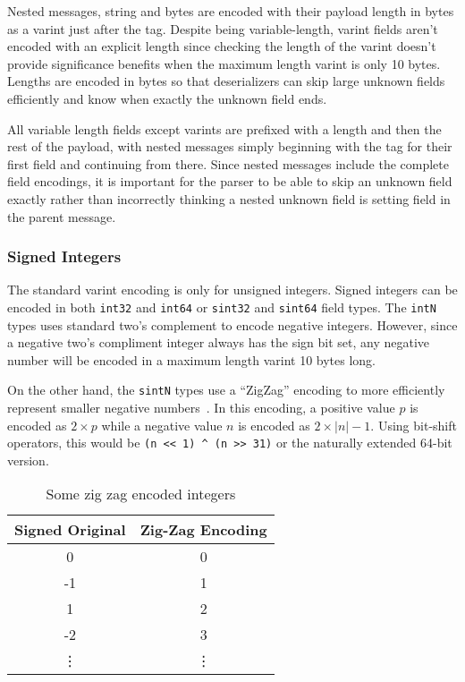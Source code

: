 \documentclass[11pt]{article}
\theoremstyle{definition}
\begin{document}
Nested messages, string and bytes are encoded with their payload length in bytes
as a varint just after the tag. Despite being variable-length, varint fields
aren't encoded with an explicit length since checking the length of the varint
doesn't provide significance benefits when the maximum length varint is only 10
bytes. Lengths are encoded in bytes so that deserializers can skip large unknown
fields efficiently and know when exactly the unknown field ends.

All variable length fields except varints are prefixed with a length and then
the rest of the payload, with nested messages simply beginning with the tag for
their first field and continuing from there. Since nested messages include the
complete field encodings, it is important for the parser to be able to skip an
unknown field exactly rather than incorrectly thinking a nested unknown field is
setting field in the parent message.

\subsubsection{Signed Integers}

The standard varint encoding is only for unsigned integers. Signed integers can
be encoded in both \texttt{int32} and \texttt{int64} or \texttt{sint32} and
\texttt{sint64} field types. The \texttt{intN} types uses standard two's
complement to encode negative integers. However, since a negative two's
compliment integer always has the sign bit set, any negative number will be
encoded in a maximum length varint 10 bytes long.

On the other hand, the \texttt{sintN} types use a ``ZigZag'' encoding to more
efficiently represent smaller negative numbers~\cite{Encoding}. In this
encoding, a positive value $p$ is encoded as $2 \times p$ while a negative value $n$
is encoded as $2 \times |n| - 1$. Using bit-shift operators, this would be
\verb|(n << 1) ^ (n >> 31)| or the naturally extended 64-bit version.

\begin{table}[htbp]
  \centering
  \begin{tabular}{cc}
    \toprule
    Signed Original & Zig-Zag Encoding \\
    \midrule
    0 & 0 \\
    -1 & 1 \\
    1 & 2 \\
    -2 & 3 \\
    \vdots & \vdots \\
    \bottomrule
  \end{tabular}
\caption{Some zig zag encoded integers}
\label{tab:zigzag}
\end{table}
\end{document}
